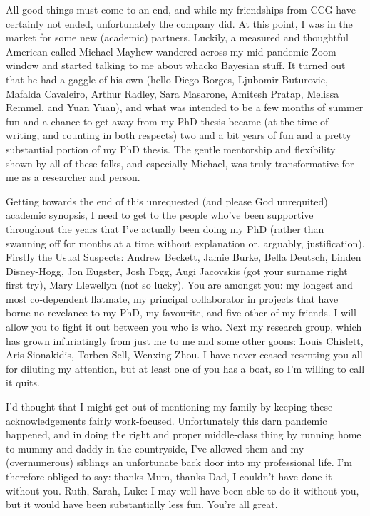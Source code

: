 \documentclass[../thesis.tex]{subfiles}
\begin{document}
All good things must come to an end, and while my friendships from CCG have certainly not ended, unfortunately the company did. At this point, I was in the market for some new (academic) partners. Luckily, a measured and thoughtful American called Michael Mayhew wandered across my mid-pandemic Zoom window and started talking to me about whacko Bayesian stuff. It turned out that he had a gaggle of his own (hello Diego Borges, Ljubomir Buturovic, Mafalda Cavaleiro, Arthur Radley, Sara Masarone, Amitesh Pratap, Melissa Remmel, and Yuan Yuan), and what was intended to be a few months of summer fun and a chance to get away from my PhD thesis became (at the time of writing, and counting in both respects) two and a bit years of fun and a pretty substantial portion of my PhD thesis. The gentle mentorship and flexibility shown by all of these folks, and especially Michael, was truly transformative for me as a researcher and person. 

Getting towards the end of this unrequested (and please God unrequited) academic synopsis, I need to get to the people who've been supportive throughout the years that I've actually been doing my PhD (rather than swanning off for months at a time without explanation or, arguably, justification). Firstly the Usual Suspects: Andrew Beckett, Jamie Burke, Bella Deutsch, Linden Disney-Hogg, Jon Eugster, Josh Fogg, Augi Jacovskis (got your surname right first try), Mary Llewellyn (not so lucky). You are amongst you: my longest and most co-dependent flatmate, my principal collaborator in projects that have borne no revelance to my PhD, my favourite, and five other of my friends. I will allow you to fight it out between you who is who. Next my research group, which has grown infuriatingly from just me to me and some other goons: Louis Chislett, Aris Sionakidis, Torben Sell, Wenxing Zhou. I have never ceased resenting you all for diluting my attention, but at least one of you has a boat, so I'm willing to call it quits.

I'd thought that I might get out of mentioning my family by keeping these acknowledgements fairly work-focused. Unfortunately this darn pandemic happened, and in doing the right and proper middle-class thing by running home to mummy and daddy in the countryside, I've allowed them and my (overnumerous) siblings an unfortunate back door into my professional life. I'm therefore obliged to say: thanks Mum, thanks Dad, I couldn't have done it without you. Ruth, Sarah, Luke: I may well have been able to do it without you, but it would have been substantially less fun. You're all great.
\end{document}
